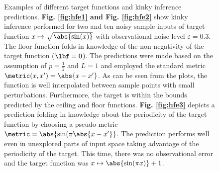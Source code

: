 \begin{figure}
        \centering
	\label{fig:exHfe1}
   \caption{Examples of different target functions and kinky inference predictions. \textbf{Fig. \ref{fig:hfe1} and  Fig. \ref{fig:hfe2}} show kinky inference performed for two and ten noisy sample inputs of target function $x\mapsto \sqrt{\abs{\sin(x)}}$ with observational noise level $\varepsilon =0.3$. The floor function folds in knowledge of the non-negativity of the target function ($\lbf = 0$). The predictions were made based on the assumption of $p=\frac 1 2$ and $L = 1$ and employed the standard metric $\metric(x,x') = \abs{x-x'}$. 
	As can be seen from the plots, the function is well interpolated between sample points with small perturbations. Furthermore, the target is within the bounds predicted by the ceiling and floor functions.
		\textbf{Fig. \ref{fig:hfe3}} depicts a prediction folding in knowledge about the periodicity of the target function by choosing a pseudo-metric $\metric = \abs{\sin(\pi \abs{x-x'}}$. The prediction performs well even in unexplored parts of input space taking advantage of the periodicity of the target. This time, there was no observational error and the target function was $x \mapsto \abs{\sin(\pi x)} +1$.   }
\end{figure}	  


